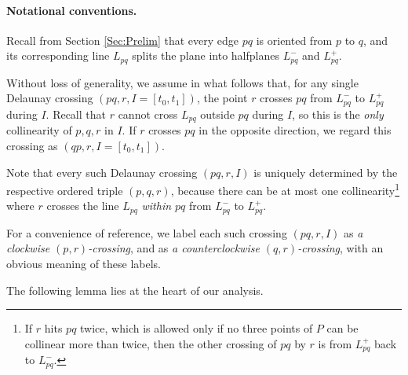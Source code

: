 \documentclass[letter,11pt]{article}
\def \L{{L}}
\begin{document}
\paragraph{Notational conventions.}
Recall from Section \ref{Sec:Prelim} that every edge $pq$ is oriented from $p$ to $q$, and its corresponding line $\L_{pq}$ splits the plane into halfplanes $\L_{pq}^-$ and $\L_{pq}^+$.

Without loss of generality, we assume in what follows that, for any single Delaunay crossing $(pq,r,I=[t_0,t_1])$, the point $r$ crosses $pq$ from $\L_{pq}^-$ to $\L_{pq}^+$ during $I$. Recall that $r$ cannot cross $\L_{pq}$ outside $pq$ during $I$, so this is the {\it only} collinearity of $p,q,r$ in $I$.
If $r$ crosses $pq$ in the opposite direction, we regard this crossing as $(qp,r,I=[t_0,t_1])$.

Note that every such Delaunay crossing $(pq,r,I)$ is uniquely determined by the respective ordered triple $(p,q,r)$, because there can be at most one collinearity\footnote{If $r$ hits $pq$ twice, which is allowed only if no three points of $P$ can be collinear more than twice, then the other crossing of $pq$ by $r$ is from $\L_{pq}^+$ back to $\L_{pq}^-$.} where $r$ crosses the line $\L_{pq}$ {\it within $pq$} from $\L_{pq}^-$ to $\L_{pq}^+$.

For a convenience of reference, we label each such crossing $(pq,r,I)$ as {\it a clockwise $(p,r)$-crossing}, and as {\it a counterclockwise $(q,r)$-crossing}, with an obvious meaning of these labels.



The following lemma lies at the heart of our analysis.
\end{document}
